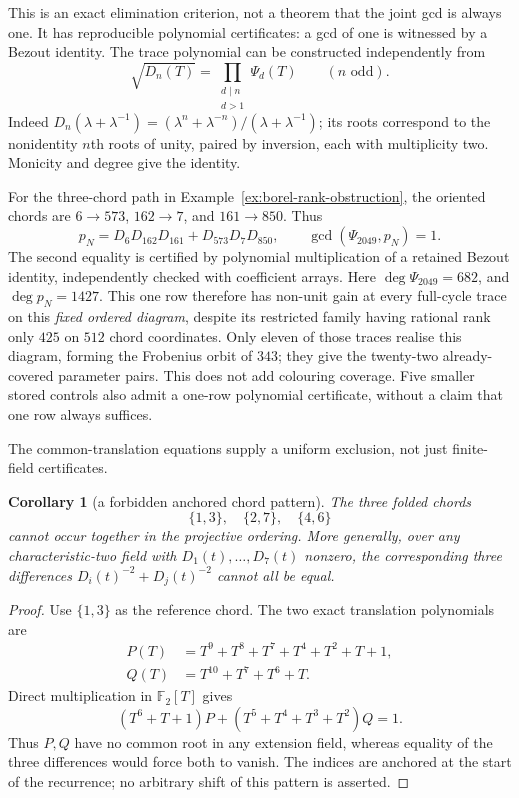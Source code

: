 \documentclass[11pt,a4paper]{article}
\newtheorem{corollary}[theorem]{Corollary}
\theoremstyle{definition}
\theoremstyle{remark}
\begin{document}
This is an exact elimination criterion, not a theorem that the joint gcd is always one.  It has reproducible polynomial certificates: a gcd of one is witnessed by a Bezout identity.  The trace polynomial can be constructed independently from
\[
                  \sqrt{D_n(T)}=\prod_{\substack{d\mid n\\d>1}}\Psi_d(T)
                  \qquad(n\text{ odd}).
\]
Indeed $D_n(\lambda+\lambda^{-1})=(\lambda^n+\lambda^{-n})/(\lambda+\lambda^{-1})$; its roots correspond to the nonidentity $n$th roots of unity, paired by inversion, each with multiplicity two.  Monicity and degree give the identity.

For the three-chord path in Example~\ref{ex:borel-rank-obstruction}, the oriented chords are $6\to573$, $162\to7$, and $161\to850$.  Thus
\[
       p_N=D_6D_{162}D_{161}+D_{573}D_7D_{850},\qquad
                       \gcd(\Psi_{2049},p_N)=1.
\]
The second equality is certified by polynomial multiplication of a retained Bezout identity, independently checked with coefficient arrays.  Here $\deg\Psi_{2049}=682$, and $\deg p_N=1427$.  This one row therefore has non-unit gain at every full-cycle trace on this \emph{fixed ordered diagram}, despite its restricted family having rational rank only $425$ on $512$ chord coordinates.  Only eleven of those traces realise this diagram, forming the Frobenius orbit of $343$; they give the twenty-two already-covered parameter pairs.  This does not add colouring coverage.  Five smaller stored controls also admit a one-row polynomial certificate, without a claim that one row always suffices.

The common-translation equations supply a uniform exclusion, not just finite-field certificates.
\begin{corollary}[a forbidden anchored chord pattern]\label{cor:borel-forbidden-anchor}
The three folded chords
\[
                         \{1,3\},\quad\{2,7\},\quad\{4,6\}
\]
cannot occur together in the projective ordering.  More generally, over any characteristic-two field with $D_1(t),\ldots,D_7(t)$ nonzero, the corresponding three differences $D_i(t)^{-2}+D_j(t)^{-2}$ cannot all be equal.
\end{corollary}
\begin{proof}
Use $\{1,3\}$ as the reference chord.  The two exact translation polynomials are
\[
 \begin{split}
  P(T)&=T^9+T^8+T^7+T^4+T^2+T+1,\\
  Q(T)&=T^{10}+T^7+T^6+T.
 \end{split}
\]
Direct multiplication in $\mathbb F_2[T]$ gives
\[
       (T^6+T+1)P+(T^5+T^4+T^3+T^2)Q=1.
\]
Thus $P,Q$ have no common root in any extension field, whereas equality of the three differences would force both to vanish.  The indices are anchored at the start of the recurrence; no arbitrary shift of this pattern is asserted.
\end{proof}
\end{document}
